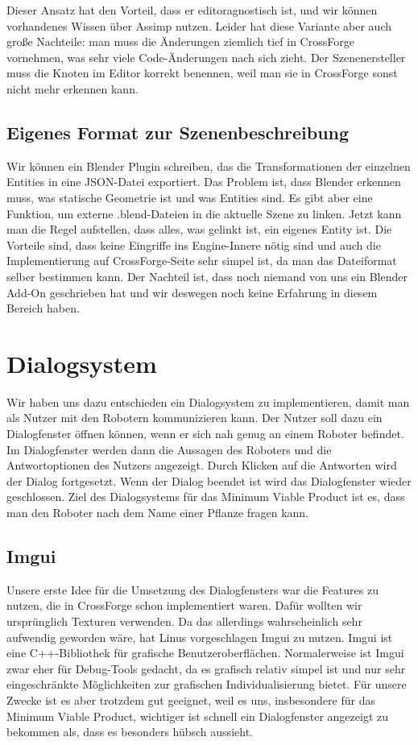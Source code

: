 Dieser Ansatz hat den Vorteil, dass er editoragnostisch ist, und wir können vorhandenes Wissen über Assimp nutzen. Leider hat diese Variante aber auch große Nachteile: man muss die Änderungen ziemlich tief in CrossForge vornehmen, was sehr viele Code-Änderungen nach sich zieht. Der Szenenersteller muss die Knoten im Editor korrekt benennen, weil man sie in CrossForge sonst nicht mehr erkennen kann.

\subsection{Eigenes Format zur Szenenbeschreibung}

Wir können ein Blender Plugin schreiben, das die Transformationen der einzelnen Entities in eine JSON-Datei exportiert. Das Problem ist, dass Blender erkennen muss, was statische Geometrie ist und was Entities sind. Es gibt aber eine Funktion, um externe .blend-Dateien in die aktuelle Szene zu linken. Jetzt kann man die Regel aufstellen, dass alles, was gelinkt ist, ein eigenes Entity ist. Die Vorteile sind, dass keine Eingriffe ins Engine-Innere nötig sind und auch die Implementierung auf CrossForge-Seite sehr simpel ist, da man das Dateiformat selber bestimmen kann. Der Nachteil ist, dass noch niemand von uns ein Blender Add-On geschrieben hat und wir deswegen noch keine Erfahrung in diesem Bereich haben.

\section{Dialogsystem}

Wir haben uns dazu entschieden ein Dialogsystem zu implementieren, damit man als Nutzer mit den Robotern kommunizieren kann. Der Nutzer soll dazu ein Dialogfenster öffnen können, wenn er sich nah genug an einem Roboter befindet. Im Dialogfenster werden dann die Aussagen des Roboters und die Antwortoptionen des Nutzers angezeigt. Durch Klicken auf die Antworten wird der Dialog fortgesetzt. Wenn der Dialog beendet ist wird das Dialogfenster wieder geschlossen. Ziel des Dialogsystems für das Minimum Viable Product ist es, dass man den Roboter nach dem Name einer Pflanze fragen kann. 

\subsection{Imgui}

Unsere erste Idee für die Umsetzung des Dialogfensters war die Features zu nutzen, die in CrossForge schon implementiert waren. Dafür wollten wir ursprünglich Texturen verwenden. Da das allerdings wahrscheinlich sehr aufwendig geworden wäre, hat Linus vorgeschlagen Imgui zu nutzen.
Imgui ist eine C++-Bibliothek für grafische Benutzeroberflächen. Normalerweise ist Imgui zwar eher für Debug-Tools gedacht, da es grafisch relativ simpel ist und nur sehr eingeschränkte Möglichkeiten zur grafischen Individualisierung bietet. Für unsere Zwecke ist es aber trotzdem gut geeignet, weil es uns, insbesondere für das Minimum Viable Product, wichtiger ist schnell ein Dialogfenster angezeigt zu bekommen als, dass es besonders hübsch aussieht. 

